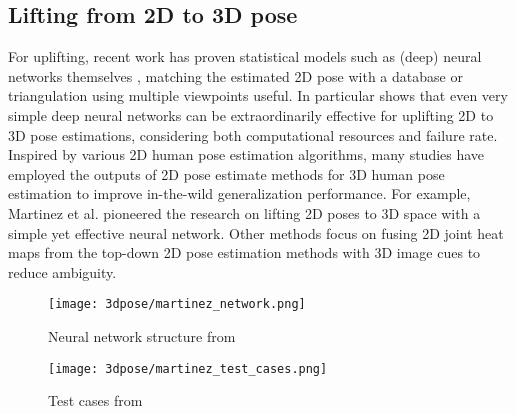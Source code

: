 \subsection{Lifting from 2D to 3D pose}
For uplifting, recent work has proven statistical models such as (deep) neural networks themselves \cite{Tome_2017_CVPR, Martinez_2017_ICCV}, matching the estimated 2D pose with a database \cite{Chen_2017_CVPR} or triangulation using multiple viewpoints \cite{Dong_2019_CVPR} useful. In particular \cite{Martinez_2017_ICCV} shows that even very simple deep neural networks can be extraordinarily effective for uplifting 2D to 3D pose estimations, considering both computational resources and failure rate.
\newline
Inspired by various 2D human pose estimation algorithms, many studies have employed the outputs of 2D pose estimate methods for 3D human pose estimation to improve in-the-wild generalization performance. For example, Martinez et al. \cite{Martinez_2017_ICCV} pioneered the research on lifting 2D poses to 3D space with a simple yet effective neural network. Other methods \cite{park_3d_2016, wang_deep_2021, zhou_hemlets_2019, habibie_wild_2019, tekin_learning_2017} focus on fusing 2D joint heat maps from the top-down 2D pose estimation methods with 3D image cues to reduce ambiguity. 

\begin{figure*}[!htb]
	\centering
	\texttt{[image: 3dpose/martinez\_network.png]}
	\caption{Neural network structure from \cite{Martinez_2017_ICCV}}
	\label{fig:martinez_network}
\end{figure*}

\begin{figure*}[!htb]
	\centering
	\texttt{[image: 3dpose/martinez\_test\_cases.png]}
	\caption{Test cases from \cite{Martinez_2017_ICCV}}
	\label{fig:martinez_test_cases}
\end{figure*}

